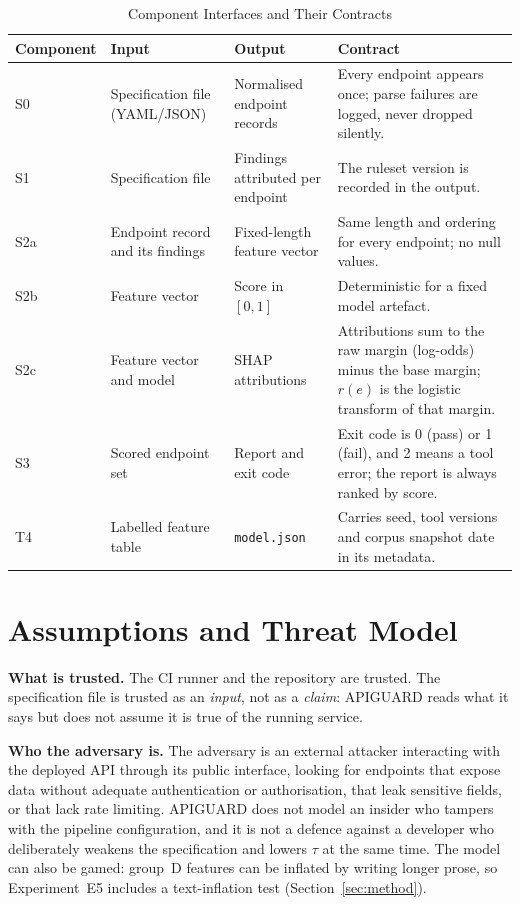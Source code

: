 \documentclass[conference]{IEEEtran}
\begin{document}
\begin{table}[!t]
\caption{Component Interfaces and Their Contracts}
\label{tab:contracts}
\centering
\footnotesize
\begin{tabularx}{\textwidth}{L{1.5cm} L{4.0cm} L{4.0cm} Y}
\toprule
\textbf{Component} & \textbf{Input} & \textbf{Output} & \textbf{Contract}\\
\midrule
S0 & Specification file (YAML/JSON) & Normalised endpoint records & Every endpoint appears
once; parse failures are logged, never dropped silently.\\
S1 & Specification file & Findings attributed per endpoint & The ruleset version is recorded
in the output.\\
S2a & Endpoint record and its findings & Fixed-length feature vector & Same length and
ordering for every endpoint; no null values.\\
S2b & Feature vector & Score in $[0,1]$ & Deterministic for a fixed model artefact.\\
S2c & Feature vector and model & SHAP attributions & Attributions sum to the raw margin (log-odds) minus the base margin;
$r(e)$ is the logistic transform of that margin.\\
S3 & Scored endpoint set & Report and exit code & Exit code is 0 (pass) or 1 (fail), and 2 means a tool error; the report is
always ranked by score.\\
T4 & Labelled feature table & \texttt{model.json} & Carries seed, tool versions and corpus
snapshot date in its metadata.\\
\bottomrule
\end{tabularx}
\end{table}

\section{Assumptions and Threat Model}
\textbf{What is trusted.} The CI runner and the repository are trusted. The specification file
is trusted as an \emph{input}, not as a \emph{claim}: APIGUARD reads what it says but does not
assume it is true of the running service.

\textbf{Who the adversary is.} The adversary is an external attacker interacting with the
deployed API through its public interface, looking for endpoints that expose data without
adequate authentication or authorisation, that leak sensitive fields, or that lack rate
limiting. APIGUARD does not model an insider who tampers with the pipeline configuration, and
it is not a defence against a developer who deliberately weakens the specification and lowers
$\tau$ at the same time. The model can also be gamed: group~D features can be inflated by
writing longer prose, so Experiment~E5 includes a text-inflation test (Section~\ref{sec:method}).
\end{document}
